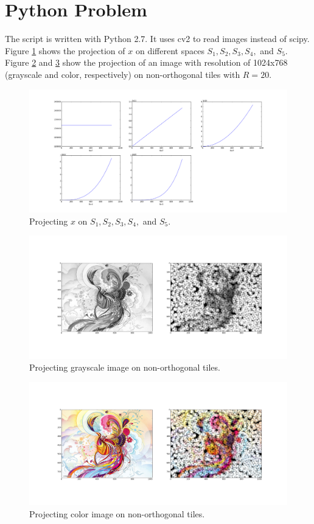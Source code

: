 \section{Python Problem}\label{sec:part5}

The script is written with Python 2.7. It uses cv2 to read images instead of scipy. Figure \ref{fig:ortho_proj} shows the projection of $x$ on different spaces $S_1, S_2, S_3, S_4,$ and $S_5$. Figure \ref{fig:tile_proj} and \ref{fig:tile_proj_color} show the projection of an image with resolution of 1024x768 (grayscale and color, respectively) on non-orthogonal tiles with $R=20$.

\begin{figure}[htbp]
	\centering
	\includegraphics[width=\textwidth,trim={2in 0in 2in 1in},clip]{images/ortho_proj}
	\caption{Projecting $x$ on $S_1, S_2, S_3, S_4,$ and $S_5$.}\label{fig:ortho_proj}
\end{figure}

\begin{figure}[htbp]
	\centering
	\includegraphics[width=\textwidth,trim={2.3in 1in 2.3in 1in},clip]{images/tile_proj}
	\caption{Projecting grayscale image on non-orthogonal tiles.}\label{fig:tile_proj}
\end{figure}

\begin{figure}[htbp]
	\centering
	\includegraphics[width=\textwidth,trim={2.3in 1in 2.3in 1in},clip]{images/tile_proj_color}
	\caption{Projecting color image on non-orthogonal tiles.}\label{fig:tile_proj_color}
\end{figure}